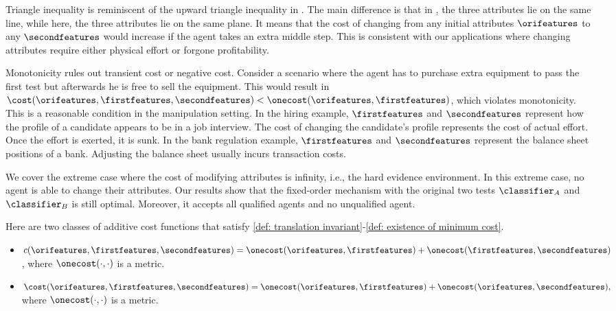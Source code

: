 Triangle inequality is reminiscent of the upward triangle inequality in \citet{perez2022test}.
The main difference is that in \citet{perez2022test}, the three attributes lie on the same line, while here, the three attributes lie on the same plane.
It means that the cost of changing from any initial attributes $\orifeatures$ to any $\secondfeatures$ would increase if the agent takes an extra middle step.
This is consistent with our applications where changing attributes require either physical effort or forgone profitability.

Monotonicity rules out transient cost or negative cost. 
Consider a scenario where the agent has to purchase extra equipment to pass the first test but afterwards he is free to sell the equipment.
This would result in $\cost(\orifeatures, \firstfeatures,\secondfeatures)<\onecost(\orifeatures, \firstfeatures)$, which violates monotonicity.
This is a reasonable condition in the manipulation setting. 
In the hiring example, $\firstfeatures$ and $\secondfeatures$ represent how the profile of a candidate appears to be in a job interview.
The cost of changing the candidate's profile represents the cost of actual effort.
Once the effort is exerted, it is sunk.
In the bank regulation example, $\firstfeatures$ and $\secondfeatures$ represent the balance sheet positions of a bank.
Adjusting the balance sheet usually incurs transaction costs.



We cover the extreme case where the cost of modifying attributes is infinity, i.e., the hard evidence environment. In this extreme case, no agent is able to change their attributes. Our results show that the fixed-order mechanism with the original two tests $\classifier_A$ and $\classifier_B$ is still optimal. Moreover, it accepts all qualified agents and no unqualified agent. 



Here are two classes of additive cost functions that satisfy \cref{def: translation invariant}-\ref{def: existence of minimum cost}.
\begin{itemize}
    \item  $
c(\orifeatures,\firstfeatures,\secondfeatures)= \onecost(\orifeatures,\firstfeatures) + \onecost(\firstfeatures,\secondfeatures) 
$, where $\onecost(\cdot,\cdot)$ is a metric.
    \item $
\cost(\orifeatures,\firstfeatures,\secondfeatures) =\onecost(\orifeatures,\firstfeatures) + \onecost(\orifeatures,\secondfeatures),
 $ where  $\onecost(\cdot,\cdot)$ is a metric.
\end{itemize}






